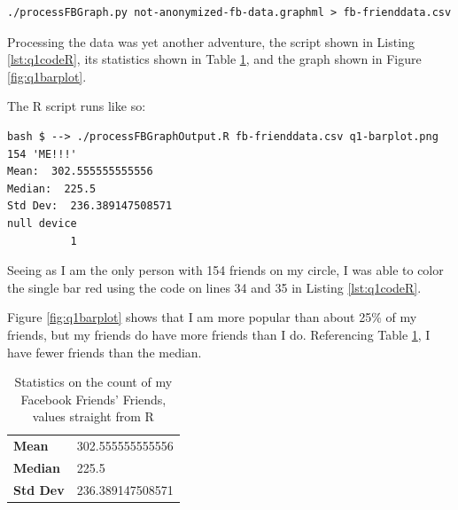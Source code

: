 \documentclass[letterpaper,11pt]{article}
\begin{document}
\begin{lstlisting}[frame=single]
./processFBGraph.py not-anonymized-fb-data.graphml > fb-frienddata.csv
\end{lstlisting}

Processing the data was yet another adventure, the script shown in Listing \ref{lst:q1codeR}, its statistics shown in Table \ref{tab:q1stats}, and the graph shown in Figure \ref{fig:q1barplot}.

The R script runs like so:
\begin{lstlisting}[frame=single]
bash $ --> ./processFBGraphOutput.R fb-frienddata.csv q1-barplot.png 154 'ME!!!'
Mean:  302.555555555556
Median:  225.5
Std Dev:  236.389147508571
null device 
          1 
\end{lstlisting}

Seeing as I am the only person with 154 friends on my circle, I was able to color the single bar red using the code on lines 34 and 35 in Listing \ref{lst:q1codeR}.

Figure \ref{fig:q1barplot} shows that I am more popular than about 25\% of my friends, but my friends do have more friends than I do.  Referencing Table \ref{tab:q1stats}, I have fewer friends than the median.

\begin{table}
\begin{tabular}{ l l }
\hline
\textbf{Mean} & 302.555555555556 \\
\textbf{Median} & 225.5 \\
\textbf{Std Dev} & 236.389147508571 \\
\hline
\end{tabular}
\caption{Statistics on the count of my Facebook Friends' Friends, values straight from R}
\label{tab:q1stats}
\end{table}
\end{document}
